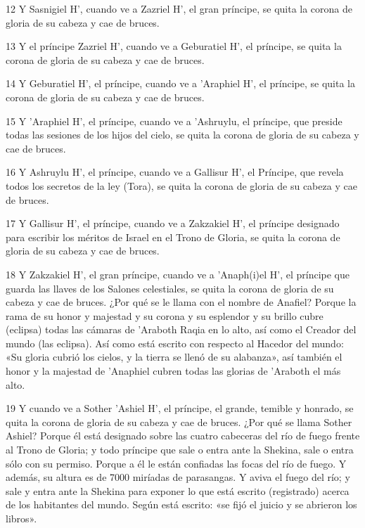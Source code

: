 \par 12 Y Sasnigiel H', cuando ve a Zazriel H', el gran príncipe, se quita la corona de gloria de su cabeza y cae de bruces.

\par 13 Y el príncipe Zazriel H', cuando ve a Geburatiel H', el príncipe, se quita la corona de gloria de su cabeza y cae de bruces.

\par 14 Y Geburatiel H', el príncipe, cuando ve a 'Araphiel H', el príncipe, se quita la corona de gloria de su cabeza y cae de bruces.

\par 15 Y 'Araphiel H', el príncipe, cuando ve a 'Ashruylu, el príncipe, que preside todas las sesiones de los hijos del cielo, se quita la corona de gloria de su cabeza y cae de bruces.

\par 16 Y Ashruylu H', el príncipe, cuando ve a Gallisur H', el Príncipe, que revela todos los secretos de la ley (Tora), se quita la corona de gloria de su cabeza y cae de bruces.

\par 17 Y Gallisur H', el príncipe, cuando ve a Zakzakiel H', el príncipe designado para escribir los méritos de Israel en el Trono de Gloria, se quita la corona de gloria de su cabeza y cae de bruces.

\par 18 Y Zakzakiel H', el gran príncipe, cuando ve a 'Anaph(i)el H', el príncipe que guarda las llaves de los Salones celestiales, se quita la corona de gloria de su cabeza y cae de bruces. ¿Por qué se le llama con el nombre de Anafiel? Porque la rama de su honor y majestad y su corona y su esplendor y su brillo cubre (eclipsa) todas las cámaras de 'Araboth Raqia en lo alto, así como el Creador del mundo (las eclipsa). Así como está escrito con respecto al Hacedor del mundo: «Su gloria cubrió los cielos, y la tierra se llenó de su alabanza», así también el honor y la majestad de 'Anaphiel cubren todas las glorias de 'Araboth el más alto.

\par 19 Y cuando ve a Sother 'Ashiel H', el príncipe, el grande, temible y honrado, se quita la corona de gloria de su cabeza y cae de bruces. ¿Por qué se llama Sother Ashiel? Porque él está designado sobre las cuatro cabeceras del río de fuego frente al Trono de Gloria; y todo príncipe que sale o entra ante la Shekina, sale o entra sólo con su permiso. Porque a él le están confiadas las focas del río de fuego. Y además, su altura es de 7000 miríadas de parasangas. Y aviva el fuego del río; y sale y entra ante la Shekina para exponer lo que está escrito (registrado) acerca de los habitantes del mundo. Según está escrito: «se fijó el juicio y se abrieron los libros».

